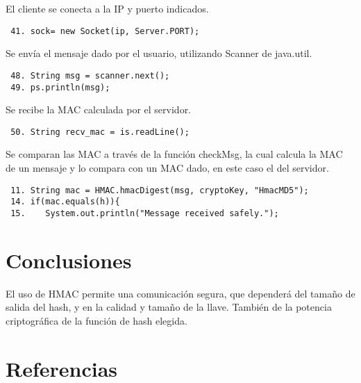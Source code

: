 \documentclass[letter, 10pt]{article}
\begin{document}
El cliente se conecta a la IP y puerto indicados.
\begin{verbatim}
 41. sock= new Socket(ip, Server.PORT);
\end{verbatim}
Se envía el mensaje dado por el usuario, utilizando Scanner de java.util.
\begin{verbatim}
 48. String msg = scanner.next(); 
 49. ps.println(msg); 
\end{verbatim}
Se recibe la MAC calculada por el servidor.
\begin{verbatim}
 50. String recv_mac = is.readLine();  
\end{verbatim}
Se comparan las MAC a través de la función checkMsg, la cual calcula la MAC de un mensaje
y lo compara con un MAC dado, en este caso el del servidor.
\begin{verbatim}
 11. String mac = HMAC.hmacDigest(msg, cryptoKey, "HmacMD5");
 14. if(mac.equals(h)){                                 
 15.    System.out.println("Message received safely.");
\end{verbatim}

\newpage
\section{Conclusiones}
El uso de HMAC permite una comunicación segura, que dependerá del tamaño de salida del hash, y en la calidad
y tamaño de la llave. También de la potencia criptográfica de la función de hash elegida.


\section{Referencias}
\end{document}
